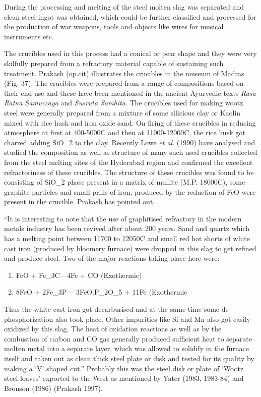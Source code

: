 During the processing and melting of the steel molten slag was separated and clean steel ingot was obtained, which could be further classified and processed for the production of war weapons, tools and objects like wires for musical instruments etc.

The crucibles used in this process had a conical or pear shape and they were very skilfully prepared from a refractory material capable of sustaining such treatment. Prakash (op.cit) illustrates the crucibles in the museum of Madras (Fig. 37). The crucibles were prepared from a range of compositions based on their end use and these have been mentioned in the ancient Ayurvedic texts \textit{Rasa Ratna Samuccaya} and \textit{Susruta Samhita}. The crucibles used for making wootz steel were generally prepared from a mixture of some silicious clay or Kaolin mixed with rice husk and iron oxide sand. On firing of these crucibles in reducing atmosphere at first at 400-5000C and then at 11000-12000C, the rice husk got charred adding SiO_2 to the clay. Recently Lowe \textit{et al}. (1990) have analysed and studied the composition as well as structure of many such used crucibles collected from the steel melting sites of the Hyderabad region and confirmed the excellent refractoriness of these crucibles. The structure of these crucibles was found to be consisting of SiO_2 phase present in a matrix of mullite (M.P. 18000C), some graphite particles and small prills of iron, produced by the reduction of FeO were present in the crucible. Prakash has pointed out,

\begin{myquote}
“It is interesting to note that the use of graphitised refractory in the modern metals industry has been revived after about 200 years. Sand and quartz which has a melting point between 11700 to 12050C and small red hot shorts of white cast iron (produced by bloomery furnace) were dropped in this slag to get refined and produce steel. Two of the major reactions taking place here were:
\end{myquote}

\begin{enumerate}
\item FeO + Fe_3C---4Fe + CO (Exothermic)

 \item 8FeO + 2Fe_3P--- 3FeO.P_2O_5 + 11Fe (Exothermic

\end{enumerate}

\begin{myquote}
Thus the white cast iron got decarburised and at the same time some de-phosphorization also took place. Other impurities like Si and Mn also got easily oxidized by this slag. The heat of oxidation reactions as well as by the combustion of carbon and CO gas generally produced sufficient heat to separate molten metal into a separate layer, which was allowed to solidify in the furnace itself and taken out as clean thick steel plate or disk and tested for its quality by making a ‘V’ shaped cut.” Probably this was the steel disk or plate of ‘Wootz steel loaves’ exported to the West as mentioned by Yater (1983, 1983-84) and Bronson (1986) (Prakash 1997).
\end{myquote}

